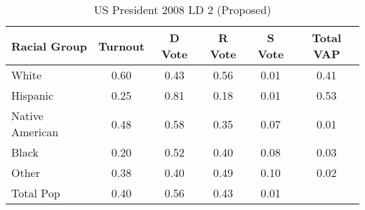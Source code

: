 \begin{table}[htb]
\begin{center}
\caption{US President 2008 LD 2 (Proposed)}
\label{pres08_vap_ld_2}
\begin{tabular}{lccccc}
  \hline
Racial Group & Turnout & D Vote & R Vote & S Vote & Total VAP \\ 
  \hline
White & 0.60 & 0.43 & 0.56 & 0.01 & 0.41 \\ 
  Hispanic & 0.25 & 0.81 & 0.18 & 0.01 & 0.53 \\ 
  Native American & 0.48 & 0.58 & 0.35 & 0.07 & 0.01 \\ 
  Black & 0.20 & 0.52 & 0.40 & 0.08 & 0.03 \\ 
  Other & 0.38 & 0.40 & 0.49 & 0.10 & 0.02 \\ 
  Total Pop & 0.40 & 0.56 & 0.43 & 0.01 &  \\ 
   \hline
\end{tabular}
\end{center}
\end{table}
